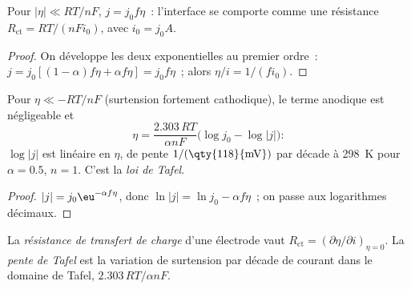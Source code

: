 \begin{corollary}\label{cor:b3:electrode-kinetics:linear}
Pour $|\eta| \ll RT/nF$, $j = j_0f\eta$~: l'interface se comporte comme
une résistance
$R_{\mathrm{ct}} = RT/(nFi_0)$, avec $i_0 = j_0A$.
\end{corollary}

\begin{proof}
On développe les deux exponentielles au premier ordre~: $j = j_0[(1 - \alpha)f\eta + \alpha f\eta] = j_0f\eta$~;
alors
$\eta/i = 1/(fi_0)$.
\end{proof}

\begin{corollary}\label{cor:b3:electrode-kinetics:tafel}
Pour $\eta \ll -RT/nF$ (surtension fortement cathodique), le terme
anodique est négligeable et
\[
  \eta = \frac{2.303\,RT}{\alpha nF}\bigl(\log j_0 - \log|j|\bigr):
\]
$\log|j|$ est linéaire en $\eta$, de pente $1/(\text{\qty{118}{mV}})$
par décade à \qty{298}{K} pour $\alpha = 0.5$, $n =
1$. C'est la \emph{loi de Tafel}.
\end{corollary}

\begin{proof}
$|j| = j_0\eu^{-\alpha f\eta}$, donc $\ln|j| = \ln j_0 - \alpha f\eta$~; on passe aux logarithmes décimaux.
\end{proof}

\begin{definition}\label{def:b3:electrode-kinetics:charge-transfer}
La \emph{résistance de transfert de charge} d'une
électrode vaut $R_{\mathrm{ct}} = (\partial\eta/\partial i)_{\eta = 0}$. La \emph{pente de Tafel}
est la variation de surtension par décade de courant dans le domaine de
Tafel,
$2.303\,RT/\alpha nF$.
\end{definition}

